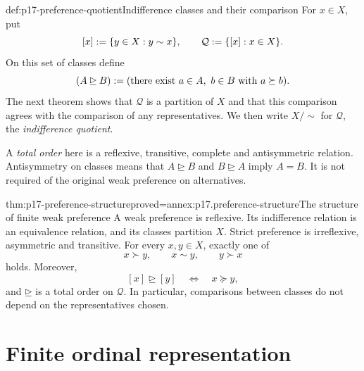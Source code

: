 \begin{hbdefinition}{def:p17-preference-quotient}{Indifference classes and their comparison}
For \(x\in X\), put
\[
 [x]\mathrel{:=}\{y\in X:y\sim x\},\qquad
 \mathcal Q\mathrel{:=}\{[x]:x\in X\}.
\]
On this set of classes define
\[
 (A\unrhd B)\mathrel{:=}
   (\text{there exist }a\in A,\ b\in B\text{ with }a\succeq b).
\]
The next theorem shows that \(\mathcal Q\) is a partition of \(X\)
and that this comparison agrees with the comparison of any representatives.
We then write \(X/{\sim}\) for \(\mathcal Q\), the
\emph{indifference quotient}.

A \emph{total order} here is a reflexive, transitive, complete and
antisymmetric relation. Antisymmetry on classes means that
\(A\unrhd B\) and \(B\unrhd A\) imply \(A=B\).
It is not required of the original weak preference on alternatives.
\end{hbdefinition}

\begin{hbtheorem}{thm:p17-preference-structure}{proved=annex:p17.preference-structure}{The structure of finite weak preference}
A weak preference is reflexive. Its indifference relation is an equivalence
relation, and its classes partition \(X\). Strict preference is
irreflexive, asymmetric and transitive. For every \(x,y\in X\),
exactly one of
\[
 x\succ y,\qquad x\sim y,\qquad y\succ x
\]
holds. Moreover,
\[
 [x]\unrhd[y]\quad\Longleftrightarrow\quad x\succeq y,
\]
and \(\unrhd\) is a total order on \(\mathcal Q\). In particular,
comparisons between classes do not depend on the representatives chosen.
\end{hbtheorem}

\section{Finite ordinal representation}
\label{sec:p17-ordinal-representation}

